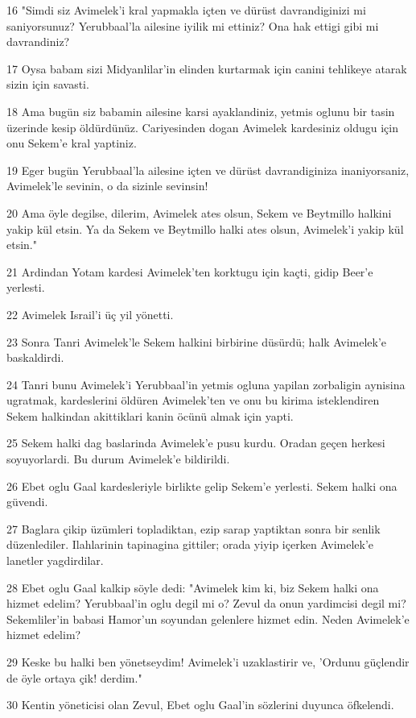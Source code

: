 \par 16 "Simdi siz Avimelek'i kral yapmakla içten ve dürüst davrandiginizi mi saniyorsunuz? Yerubbaal'la ailesine iyilik mi ettiniz? Ona hak ettigi gibi mi davrandiniz?
\par 17 Oysa babam sizi Midyanlilar'in elinden kurtarmak için canini tehlikeye atarak sizin için savasti.
\par 18 Ama bugün siz babamin ailesine karsi ayaklandiniz, yetmis oglunu bir tasin üzerinde kesip öldürdünüz. Cariyesinden dogan Avimelek kardesiniz oldugu için onu Sekem'e kral yaptiniz.
\par 19 Eger bugün Yerubbaal'la ailesine içten ve dürüst davrandiginiza inaniyorsaniz, Avimelek'le sevinin, o da sizinle sevinsin!
\par 20 Ama öyle degilse, dilerim, Avimelek ates olsun, Sekem ve Beytmillo halkini yakip kül etsin. Ya da Sekem ve Beytmillo halki ates olsun, Avimelek'i yakip kül etsin."
\par 21 Ardindan Yotam kardesi Avimelek'ten korktugu için kaçti, gidip Beer'e yerlesti.
\par 22 Avimelek Israil'i üç yil yönetti.
\par 23 Sonra Tanri Avimelek'le Sekem halkini birbirine düsürdü; halk Avimelek'e baskaldirdi.
\par 24 Tanri bunu Avimelek'i Yerubbaal'in yetmis ogluna yapilan zorbaligin aynisina ugratmak, kardeslerini öldüren Avimelek'ten ve onu bu kirima isteklendiren Sekem halkindan akittiklari kanin öcünü almak için yapti.
\par 25 Sekem halki dag baslarinda Avimelek'e pusu kurdu. Oradan geçen herkesi soyuyorlardi. Bu durum Avimelek'e bildirildi.
\par 26 Ebet oglu Gaal kardesleriyle birlikte gelip Sekem'e yerlesti. Sekem halki ona güvendi.
\par 27 Baglara çikip üzümleri topladiktan, ezip sarap yaptiktan sonra bir senlik düzenlediler. Ilahlarinin tapinagina gittiler; orada yiyip içerken Avimelek'e lanetler yagdirdilar.
\par 28 Ebet oglu Gaal kalkip söyle dedi: "Avimelek kim ki, biz Sekem halki ona hizmet edelim? Yerubbaal'in oglu degil mi o? Zevul da onun yardimcisi degil mi? Sekemliler'in babasi Hamor'un soyundan gelenlere hizmet edin. Neden Avimelek'e hizmet edelim?
\par 29 Keske bu halki ben yönetseydim! Avimelek'i uzaklastirir ve, 'Ordunu güçlendir de öyle ortaya çik! derdim."
\par 30 Kentin yöneticisi olan Zevul, Ebet oglu Gaal'in sözlerini duyunca öfkelendi.
